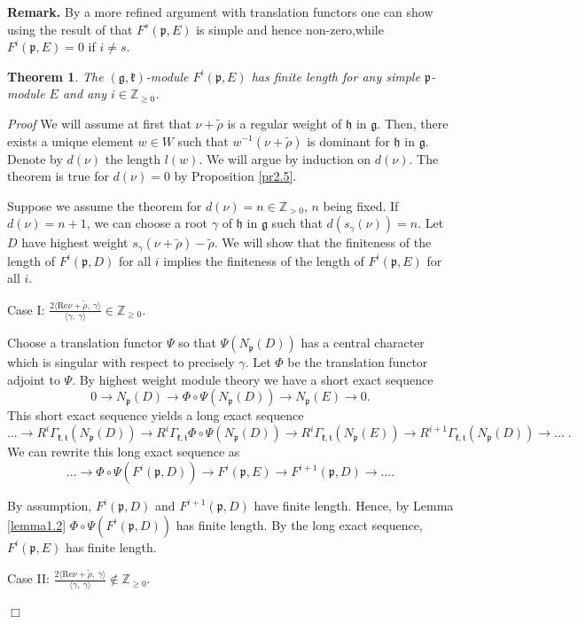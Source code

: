\documentclass[11pt]{amsart}
\newcounter{theorem}
\newtheorem{theo}{Theorem}[section]
\renewenvironment{proof}{ \emph{Proof}}{$\Box$}
\renewcommand{\tt}{\mathfrak{t}}
\newcommand{\kk}{\mathfrak{k}}
\newcommand{\hh}{\mathfrak{h}}
\newcommand{\pp}{\mathfrak{p}}
\renewcommand{\gg}{\mathfrak{g}}
\newcommand{\refle}[1]{Lemma \ref{#1}}
\newcommand{\refprop}[1]{Proposition \ref{#1}}
\newcommand{\field}[1]{\mathbb{#1}}
\begin{document}
\textbf{Remark.} By a more refined argument with translation functors \cite{BG} one can show using the result of \cite{PZ3} that $F^s(\pp,E)$ is simple and hence non-zero,while $F^{i}(\pp,E)=0$ if $i\neq s$.
\begin{theo}\label{th2.6}
The $(\gg,\kk)$-module $F^i(\pp,E)$ has finite length for any simple $\pp$-module $E$ and any $i\in\field{Z}_{\geq 0}$.
\end{theo}
\begin{proof}
We will assume at first that $\nu+\tilde{\rho}$ is a regular weight of $\hh$ in $\gg$. Then, there exists a unique element $w\in W$ such that $w^{-1}(\nu+\tilde{\rho})$ is dominant for $\hh$ in $\gg$. Denote by $d(\nu)$ the length $l(w)$. We will argue by induction on $d(\nu)$. The theorem is true for $d(\nu)=0$ by \refprop{pr2.5}.

Suppose we assume the theorem for $d(\nu)=n\in\field{Z}_{>0}$, $n$ being fixed. If $d(\nu)=n+1$, we can choose a root $\gamma$ of $\hh$ in $\gg$ such that $d(s_{\gamma}(\nu))=n$. Let $D$ have highest weight $s_{\gamma}(\nu+\tilde{\rho})-\tilde{\rho}$. We will show that the finiteness of the length of $F^i(\pp,D)$ for all $i$ implies the finiteness of the length of $F^i(\pp,E)$ for all $i$.

Case I: $\frac{2\langle\mathrm{Re}\nu+\tilde{\rho},\ \gamma\rangle}{\langle\gamma,\ \gamma\rangle}\in\field{Z}_{\geq 0}$.

Choose a translation functor $\Psi$ so that $\Psi(N_\pp(D))$ has a central character which is singular with respect to precisely $\gamma$. Let $\Phi$ be the translation functor adjoint to $\Psi$.
By highest weight module theory we have a short exact sequence $$0\rightarrow N_\pp(D)\rightarrow\Phi\circ\Psi(N_\pp(D))\rightarrow N_\pp(E)\rightarrow 0.$$
This short exact sequence yields a long exact sequence $$...\rightarrow R^i\Gamma_{\kk,\tt}(N_\pp(D))\rightarrow R^i\Gamma_{\kk,\tt}\Phi\circ\Psi(N_\pp(D))\rightarrow R^i\Gamma_{\kk,\tt}(N_\pp(E))\rightarrow R^{i+1}\Gamma_{\kk,\tt}(N_\pp(D))\rightarrow ...\; .$$
We can rewrite this long exact sequence as $$...\rightarrow\Phi\circ\Psi(F^i(\pp,D))\rightarrow F^i(\pp,E)\rightarrow F^{i+1}(\pp,D)\rightarrow ... .$$

By assumption, $F^i(\pp,D)$ and $F^{i+1}(\pp,D)$ have finite length. Hence, by \refle{lemma1.2} $\Phi\circ\Psi(F^i(\pp,D))$ has finite length. By the long exact sequence, $F^{i}(\pp,E)$ has finite length.

Case II: $\frac{2\langle\mathrm{Re}\nu+\tilde{\rho},\ \gamma\rangle}{\langle\gamma,\ \gamma\rangle}\notin\field{Z}_{\geq 0}$.


\end{proof}
\end{document}
